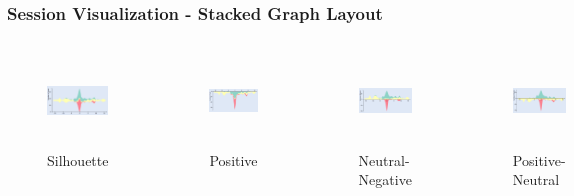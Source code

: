 \documentclass[xcolor=table]{beamer}
\begin{document}
\begin{frame}
\frametitle{Session Visualization - Stacked Graph Layout}
\begin{columns}
\centering
\begin{figure}
\includegraphics[width=5cm,height=2.4cm]{images/stackedgraph_silhouette.png}
\caption{Silhouette}
\end{figure}
\begin{figure}
\includegraphics[width=5cm,height=2.4cm]{images/stackedgraph_positive.png}
\caption{Positive}
\end{figure}

\centering
\begin{figure}
\includegraphics[width=5cm,height=2.4cm]{images/stackedgraph_neutral_neg.png}
\caption{Neutral-Negative}
\end{figure}
\begin{figure}
\includegraphics[width=5cm,height=2.4cm]{images/stackedgraph_positive_neutral.png}
\caption{Positive-Neutral}
\end{figure}

\end{columns}
\end{frame}
\end{document}
